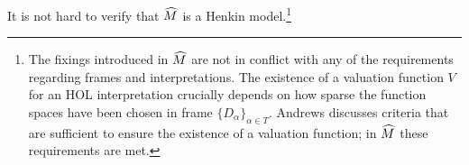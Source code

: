 \begin{defn}
It is not hard to verify that $\widehat{M}$ is a Henkin
model.\footnote{The fixings introduced in $\widehat{M}$
  are not in conflict with any of the requirements regarding
  frames and interpretations. The existence of a valuation function
  ${V}$ for an HOL interpretation crucially depends on how sparse the
  function spaces have been chosen in frame $\{D_\alpha\}_{\alpha \in
    {T}}$. Andrews \cite{Andrews:gmae72} discusses criteria that are sufficient
  to ensure the existence of a valuation function; in
  $\widehat{M}$ these requirements are met.}
 
\end{defn}


